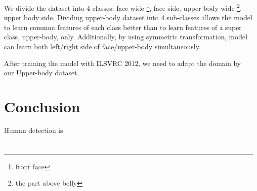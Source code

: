 \documentclass[conference]{IEEEtran}
\begin{document}
We divide the dataset into 4 classes: face wide \footnote{front face}, face side, upper body wide \footnote{the part above belly}, upper body side. Dividing upper-body dataset into 4 sub-classes allows the model to learn common features of each class better than to learn features of a super class, upper-body, only. Additionally, by using symmetric transformation, model can learn both left/right side of face/upper-body simultaneously.

After training the model with ILSVRC 2012, we need to adapt the domain by our Upper-body dataset. 





\section{Conclusion}
Human detection is





\pagebreak
\section*{}
\pagebreak








%
%
%




\end{document}
